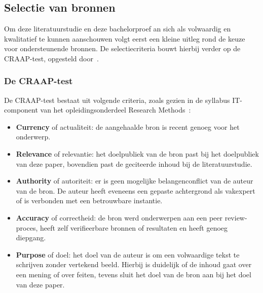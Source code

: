 \chapter{}
\label{ch:stand-van-zaken}



\section{Selectie van bronnen}
\label{sec:selectie-van-bronnen}
Om deze literatuurstudie en deze bachelorproef an sich als volwaardig en kwalitatief te kunnen aanschouwen volgt eerst een kleine uitleg rond de keuze voor ondersteunende bronnen.
De selectiecriteria bouwt hierbij verder op de CRAAP-test, opgesteld door~\textcite{Blakeslee2004}.

\subsection{De CRAAP-test}
\label{subsec:de-craap-test}
De CRAAP-test bestaat uit volgende criteria, zoals gezien in de syllabus IT-component van het opleidingsonderdeel Research Methods~\autocite{Bert2023}:
\begin{itemize}
    \item \textbf{Currency} of actualiteit: de aangehaalde bron is recent genoeg voor het onderwerp.
    \item \textbf{Relevance} of relevantie: het doelpubliek van de bron past bij het doelpubliek van deze paper, bovendien past de geciteerde inhoud bij de literatuurstudie.
    \item \textbf{Authority} of autoriteit: er is geen mogelijke belangenconflict van de auteur van de bron.
    De auteur heeft eveneens een gepaste achtergrond als vakexpert of is verbonden met een betrouwbare instantie.
    \item \textbf{Accuracy} of correctheid: de bron werd onderwerpen aan een peer review-proces, heeft zelf verifieerbare bronnen of resultaten en heeft genoeg diepgang.
    \item \textbf{Purpose} of doel: het doel van de auteur is om een volwaardige tekst te schrijven zonder vertekend beeld.
    Hierbij is duidelijk of de inhoud gaat over een mening of over feiten, tevens sluit het doel van de bron aan bij het doel van deze paper.
\end{itemize}

